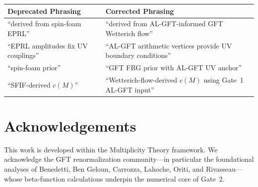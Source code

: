 \documentclass[11pt,a4paper]{article}
\theoremstyle{definition}
\theoremstyle{plain}
\theoremstyle{remark}
\begin{document}
\begin{center}
\renewcommand{\arraystretch}{1.2}
\begin{tabular}{p{6cm}p{7cm}}
  \toprule
  \textbf{Deprecated Phrasing} & \textbf{Corrected Phrasing} \\
  \midrule
  ``derived from spin-foam EPRL'' &
  ``derived from AL-GFT-informed GFT Wetterich flow'' \\
  ``EPRL amplitudes fix UV couplings'' &
  ``AL-GFT arithmetic vertices provide UV boundary conditions'' \\
  ``spin-foam prior'' &
  ``GFT FRG prior with AL-GFT UV anchor'' \\
  ``SFIF-derived $c(M)$'' &
  ``Wetterich-flow-derived $c(M)$ using Gate~1 AL-GFT input'' \\
  \bottomrule
\end{tabular}
\end{center}


\section*{Acknowledgements}

This work is developed within the Multiplicity Theory framework.
We acknowledge the GFT renormalization community---in particular
the foundational analyses of Benedetti, Ben Geloun, Carrozza, Lahoche,
Oriti, and Rivasseau---whose beta-function calculations underpin
the numerical core of Gate~2.
\end{document}

